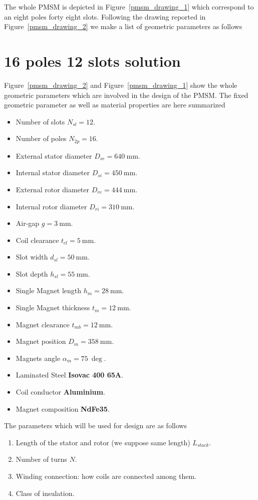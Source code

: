 \documentclass[11pt,a4paper,oneside]{book}
\begin{document}
\begin{onehalfspace}
The whole PMSM is depicted in Figure~\ref{pmsm_drawing_1} which correspond to an eight poles forty eight slots.
Following the drawing reported in Figure~\ref{pmsm_drawing_2} we make a list of geometric parameters as follows


\section{16 poles 12 slots solution}
Figure~\ref{pmsm_drawing_2} and Figure~\ref{pmsm_drawing_1} show the whole geometric parameters which are involved in the design of the PMSM. The fixed geometric parameter as well as material properties are here summarized
\begin{itemize}
	\item Number of slots $N_{sl}=12$.	
	\item Number of poles $N_{2p}=16$.
	\item External stator diameter $D_{se}=\SI{640}{\milli\meter}$.
	\item Internal stator diameter $D_{si}=\SI{450}{\milli\meter}$.
	\item External rotor diameter $D_{re}=\SI{444}{\milli\meter}$.
	\item Internal rotor diameter $D_{ri}=\SI{310}{\milli\meter}$.
	\item Air-gap $g=\SI{3}{\milli\meter}$.
	\item Coil clearance $t_{cl}=\SI{5}{\milli\meter}$.
	\item Slot width $d_{sl}=\SI{50}{\milli\meter}$.
	\item Slot depth $h_{sl}=\SI{55}{\milli\meter}$.
	\item Single Magnet length $h_{m}=\SI{28}{\milli\meter}$.
	\item Single Magnet thickness $t_{m}=\SI{12}{\milli\meter}$.
	\item Magnet clearance $t_{mb}=\SI{12}{\milli\meter}$.
	\item Magnet position $D_{m}=\SI{358}{\milli\meter}$.
	\item Magnets angle $\alpha_{m}=\SI{75}{\deg}$.
	\item Laminated Steel \textbf{Isovac 400 65A}.
	\item Coil conductor \textbf{Aluminium}.
	\item Magnet composition \textbf{NdFe35}.
\end{itemize}
The parameters which will be used for design are as follows
\begin{enumerate}
	\item Length of the stator and rotor (we suppose same length) $L_{stack}$.
	\item Number of turns $N$.
	\item Winding connection: how coils are connected among them.
	\item Class of insulation.
\end{enumerate}



\end{onehalfspace}
\end{document}
